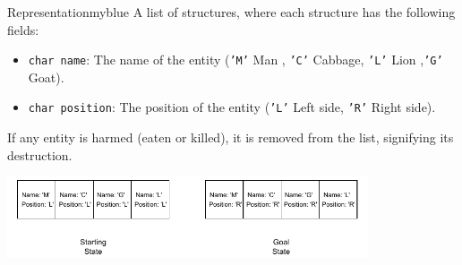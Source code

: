 \vspace{0.5cm}
\begin{prettyBox}{Representation}{myblue}
A list of structures, where each structure has the following fields:
\begin{itemize}
    \item \texttt{char name}: The name of the entity (\texttt{'M'} Man , \texttt{'C'} Cabbage, \texttt{'L'} Lion ,\texttt{'G'} Goat).
    \item \texttt{char position}: The position of the entity (\texttt{'L'} Left side, \texttt{'R'} Right side).
\end{itemize}

If any entity is harmed (eaten or killed), it is removed from the list, signifying its destruction.
\end{prettyBox}

\vspace{0.5cm}
\begin{center}
    \includegraphics[width=0.8\textwidth]{Chapters/Example/Uninformed/ex2.2.drawio.pdf}
\end{center}

